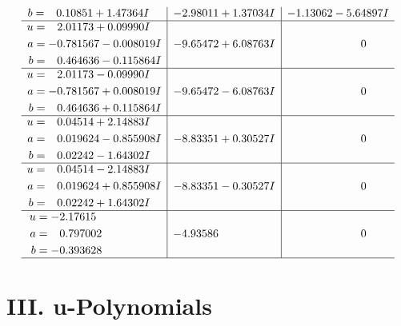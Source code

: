 \documentclass[1p]{elsarticle_modified}
\theoremstyle{definition}
\begin{document}
$$\begin{array}{c|c|c}
\begin{aligned}
b &= \phantom{-}0.10851 + 1.47364 I\end{aligned}
 & -2.98011 + 1.37034 I & -1.13062 - 5.64897 I \\ \hline\begin{aligned}
u &= \phantom{-}2.01173 + 0.09990 I \\
a &= -0.781567 - 0.008019 I \\
b &= \phantom{-}0.464636 - 0.115864 I\end{aligned}
 & -9.65472 + 6.08763 I & \phantom{-0.000000 } 0 \\ \hline\begin{aligned}
u &= \phantom{-}2.01173 - 0.09990 I \\
a &= -0.781567 + 0.008019 I \\
b &= \phantom{-}0.464636 + 0.115864 I\end{aligned}
 & -9.65472 - 6.08763 I & \phantom{-0.000000 } 0 \\ \hline\begin{aligned}
u &= \phantom{-}0.04514 + 2.14883 I \\
a &= \phantom{-}0.019624 - 0.855908 I \\
b &= \phantom{-}0.02242 - 1.64302 I\end{aligned}
 & -8.83351 + 0.30527 I & \phantom{-0.000000 } 0 \\ \hline\begin{aligned}
u &= \phantom{-}0.04514 - 2.14883 I \\
a &= \phantom{-}0.019624 + 0.855908 I \\
b &= \phantom{-}0.02242 + 1.64302 I\end{aligned}
 & -8.83351 - 0.30527 I & \phantom{-0.000000 } 0 \\ \hline\begin{aligned}
u &= -2.17615\phantom{ +0.000000I} \\
a &= \phantom{-}0.797002\phantom{ +0.000000I} \\
b &= -0.393628\phantom{ +0.000000I}\end{aligned}
 & -4.93586\phantom{ +0.000000I} & \phantom{-0.000000 } 0\\
 \hline 
 \end{array}$$\newpage
\newpage\renewcommand{\arraystretch}{1}
\centering \section*{ III. u-Polynomials}
\end{document}
